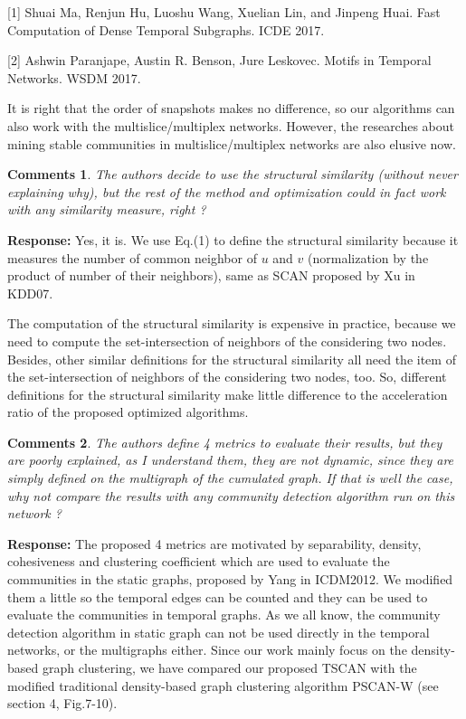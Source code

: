 \documentclass{article}
\newtheorem{Comments}{\textbf{Comments}}
\begin{document}
[1] Shuai Ma, Renjun Hu, Luoshu Wang, Xuelian Lin, and Jinpeng Huai. Fast Computation of Dense Temporal Subgraphs. ICDE 2017. 

[2] Ashwin Paranjape, Austin R. Benson, Jure Leskovec. Motifs in Temporal Networks. WSDM 2017.


It is right that the order of snapshots makes no difference, so our algorithms can also work with the multislice/multiplex networks. However, the researches about mining stable communities in multislice/multiplex networks are also elusive now. %






\begin{Comments}
	The authors decide to use the structural similarity (without never explaining why), but the rest of the method and optimization could in fact work with any similarity measure, right ?
\end{Comments}
\noindent \textbf{Response: } Yes, it is. We use Eq.(1) to define the structural similarity because it measures the number of common neighbor of $u$ and $v$ (normalization by the product of number of their neighbors), same as SCAN proposed by Xu in KDD07.

The computation of the structural similarity is expensive in practice, because we need to compute the set-intersection of neighbors of the considering two nodes. Besides, other similar definitions for the structural similarity all need the item of the set-intersection of neighbors of the considering two nodes, too. So, different definitions for the structural similarity make little difference to the acceleration ratio of the proposed optimized algorithms.

\begin{Comments}	
	The authors define 4 metrics to evaluate their results, but they are poorly explained, as I understand them, they are not dynamic, since they are simply defined on the multigraph of the cumulated graph. If that is well the case, why not compare the results with any community detection algorithm run on this network ?
\end{Comments}
\noindent \textbf{Response: } The proposed 4 metrics are motivated by separability, density, cohesiveness and clustering coefficient which are used to evaluate the communities in the static graphs, proposed by Yang in ICDM2012. We modified them a little so the temporal edges can be counted and they can be used to evaluate the communities in temporal graphs. As we all know, the community detection algorithm in static graph can not be used directly in the temporal networks, or the multigraphs either. 
Since our work mainly focus on the density-based graph clustering, we have compared our proposed TSCAN with the modified traditional density-based graph clustering algorithm PSCAN-W (see section 4, Fig.7-10).
\end{document}
